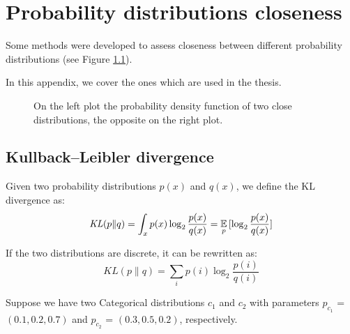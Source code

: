 \chapter{Probability distributions closeness} \label{sdist}
Some methods were developed to assess closeness between different probability distributions (see Figure \ref{fig:diffkl}).

In this appendix, we cover the ones which are used in the thesis.

\begin{figure}[h]
    \centering
    \hfill
    \caption{On the left plot the probability density function of two close distributions, the opposite on the right plot.}
    \label{fig:diffkl}
\end{figure}

\section{Kullback–Leibler divergence}
Given two probability distributions $p(x)$ and $q(x)$, we define the KL divergence as:
\[ \mathit{KL}(p \| q) = \int_x p(x) \log_2 \frac{p(x)}{q(x)} = \operatorname*{\mathbb{E}}_p{[\log_2 \frac{p(x)}{q(x)}]}\]

If the two distributions are discrete, it can be rewritten as:
\[ \mathit{KL}(p \| q) = \sum_i p(i) \log_2 \frac{p(i)}{q(i)}\]

Suppose we have two Categorical distributions $c_1$ and $c_2$ with parameters $p_{c_1}$ = $(0.1, 0.2, 0.7)$ and $p_{c_2}$ = $(0.3, 0.5, 0.2)$, respectively.

